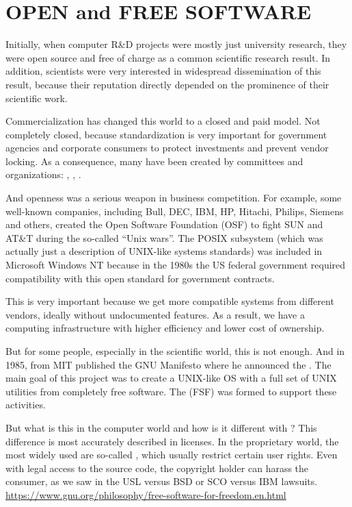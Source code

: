 \section*{OPEN and FREE SOFTWARE}

Initially, when computer R\&D projects were mostly just university research,
they were open source and free of charge as a common scientific research result.
In addition, scientists were very interested in widespread dissemination of
this result, because their reputation directly depended on the prominence of
their scientific work.

Commercialization has changed this world to a closed and paid model.
Not completely closed, because standardization is very important for
government agencies and corporate consumers to protect investments and
prevent vendor locking. As a consequence, many  have been
created by committees and organizations: , , .

And openness was a serious weapon in business competition. For example,
some well-known companies, including Bull, DEC, IBM, HP, Hitachi, Philips,
Siemens and others, created the Open Software Foundation (OSF) to fight
SUN and AT\&T during the so-called ``Unix wars''. The POSIX subsystem (which
was actually just a description of UNIX-like systems standards) was
included in Microsoft Windows NT because in the 1980s the US federal
government required compatibility with this open standard for government
contracts.

This  is very important because we get more compatible systems
from different vendors, ideally without undocumented features. As a result,
we have a computing infrastructure with higher efficiency and lower cost of
ownership.

But for some people, especially in the scientific world, this is not enough.
And in 1985,  from MIT published the GNU Manifesto
where he announced the . The main goal of this project was
to create a UNIX-like OS with a full set of UNIX utilities from completely
free software. The  (FSF) was formed
to support these activities.

But what is this  in the computer world and how is it different
with ? This difference is most accurately described in licenses.
In the proprietary world, the most widely used are so-called , which usually restrict certain user rights. Even with legal
access to the source code, the copyright holder can harass the consumer,
as we saw in the USL versus BSD or SCO versus IBM lawsuits.\\
\href{https://www.gnu.org/philosophy/free-software-for-freedom.en.html}%
{\url{https://www.gnu.org/philosophy/free-software-for-freedom.en.html}}

